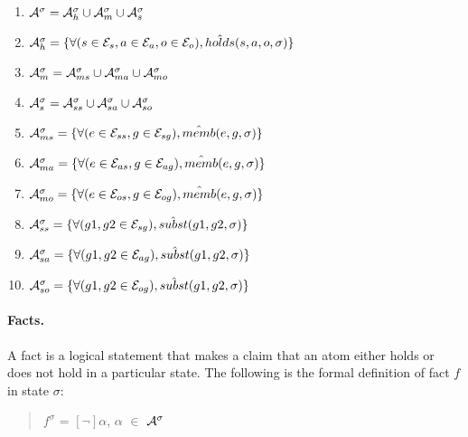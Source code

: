 \documentclass[10pt, twocolumn]{article}
\begin{document}
          \begin{enumerate}
            \item
              ${\cal A}^{\sigma} = {\cal A}^{\sigma}_{h} \cup {\cal A}^{\sigma}_{m} \cup {\cal A}^{\sigma}_{s}$
            \item
              ${\cal A}^{\sigma}_{h} = \{\forall (s \in {\cal E}_{s}, a \in {\cal E}_{a}, o \in {\cal E}_{o}), \hat{holds}(s, a, o, \sigma) \}$
            \item
              ${\cal A}^{\sigma}_{m} = {\cal A}^{\sigma}_{ms} \cup {\cal A}^{\sigma}_{ma} \cup {\cal A}^{\sigma}_{mo}$
            \item
              ${\cal A}^{\sigma}_{s} = {\cal A}^{\sigma}_{ss} \cup {\cal A}^{\sigma}_{sa} \cup {\cal A}^{\sigma}_{so}$
            \item
              ${\cal A}^{\sigma}_{ms} = \{\forall (e \in {\cal E}_{ss}, g \in {\cal E}_{sg}), \hat{memb}(e, g, \sigma)\}$
            \item
              ${\cal A}^{\sigma}_{ma} = \{\forall (e \in {\cal E}_{as}, g \in {\cal E}_{ag}), \hat{memb}(e, g, \sigma)\}$
            \item
              ${\cal A}^{\sigma}_{mo} = \{\forall (e \in {\cal E}_{os}, g \in {\cal E}_{og}), \hat{memb}(e, g, \sigma)\}$
            \item
              ${\cal A}^{\sigma}_{ss} = \{\forall (g1, g2 \in {\cal E}_{sg}), \hat{subst}(g1, g2, \sigma)\}$
            \item
              ${\cal A}^{\sigma}_{sa} = \{\forall (g1, g2 \in {\cal E}_{ag}), \hat{subst}(g1, g2, \sigma)\}$
            \item
              ${\cal A}^{\sigma}_{so} = \{\forall (g1, g2 \in {\cal E}_{og}), \hat{subst}(g1, g2, \sigma)\}$
          \end{enumerate}

        \paragraph{Facts.}
       
          A fact is a logical statement that makes a claim that an atom either
          holds or does not hold in a particular state. The following is the
          formal definition of fact $f$ in state $\sigma$:

          \begin{quote}
            $f^{\sigma}$ = $[\lnot]$$\alpha$, $\alpha$ $\in$ ${\cal A}^{\sigma}$
          \end{quote}
\end{document}
